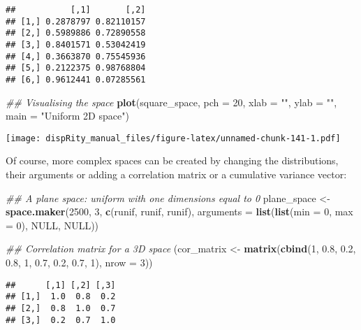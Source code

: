 \documentclass[
]{book}
\newenvironment{Shaded}{\begin{snugshade}}{\end{snugshade}}
\newcommand{\CommentTok}[1]{\textcolor[rgb]{0.56,0.35,0.01}{\textit{#1}}}
\newcommand{\DataTypeTok}[1]{\textcolor[rgb]{0.13,0.29,0.53}{#1}}
\newcommand{\DecValTok}[1]{\textcolor[rgb]{0.00,0.00,0.81}{#1}}
\newcommand{\FloatTok}[1]{\textcolor[rgb]{0.00,0.00,0.81}{#1}}
\newcommand{\KeywordTok}[1]{\textcolor[rgb]{0.13,0.29,0.53}{\textbf{#1}}}
\newcommand{\NormalTok}[1]{#1}
\newcommand{\OtherTok}[1]{\textcolor[rgb]{0.56,0.35,0.01}{#1}}
\newcommand{\StringTok}[1]{\textcolor[rgb]{0.31,0.60,0.02}{#1}}
\begin{document}
\begin{verbatim}
##           [,1]       [,2]
## [1,] 0.2878797 0.82110157
## [2,] 0.5989886 0.72890558
## [3,] 0.8401571 0.53042419
## [4,] 0.3663870 0.75545936
## [5,] 0.2122375 0.98768804
## [6,] 0.9612441 0.07285561
\end{verbatim}

\begin{Shaded}
\begin{Highlighting}[]
\CommentTok{\#\# Visualising the space}
\KeywordTok{plot}\NormalTok{(square\_space, }\DataTypeTok{pch =} \DecValTok{20}\NormalTok{, }\DataTypeTok{xlab =} \StringTok{""}\NormalTok{, }\DataTypeTok{ylab =} \StringTok{""}\NormalTok{,}
     \DataTypeTok{main =} \StringTok{"Uniform 2D space"}\NormalTok{)}
\end{Highlighting}
\end{Shaded}

\texttt{[image: dispRity\_manual\_files/figure-latex/unnamed-chunk-141-1.pdf]}

Of course, more complex spaces can be created by changing the distributions, their arguments or adding a correlation matrix or a cumulative variance vector:

\begin{Shaded}
\begin{Highlighting}[]
\CommentTok{\#\# A plane space: uniform with one dimensions equal to 0}
\NormalTok{plane\_space \textless{}{-}}\StringTok{ }\KeywordTok{space.maker}\NormalTok{(}\DecValTok{2500}\NormalTok{, }\DecValTok{3}\NormalTok{, }\KeywordTok{c}\NormalTok{(runif, runif, runif),}
                           \DataTypeTok{arguments =} \KeywordTok{list}\NormalTok{(}\KeywordTok{list}\NormalTok{(}\DataTypeTok{min =} \DecValTok{0}\NormalTok{, }\DataTypeTok{max =} \DecValTok{0}\NormalTok{),}
                           \OtherTok{NULL}\NormalTok{, }\OtherTok{NULL}\NormalTok{))}

\CommentTok{\#\# Correlation matrix for a 3D space}
\NormalTok{(cor\_matrix \textless{}{-}}\StringTok{ }\KeywordTok{matrix}\NormalTok{(}\KeywordTok{cbind}\NormalTok{(}\DecValTok{1}\NormalTok{, }\FloatTok{0.8}\NormalTok{, }\FloatTok{0.2}\NormalTok{, }\FloatTok{0.8}\NormalTok{, }\DecValTok{1}\NormalTok{, }\FloatTok{0.7}\NormalTok{, }\FloatTok{0.2}\NormalTok{, }\FloatTok{0.7}\NormalTok{, }\DecValTok{1}\NormalTok{), }\DataTypeTok{nrow =} \DecValTok{3}\NormalTok{))}
\end{Highlighting}
\end{Shaded}

\begin{verbatim}
##      [,1] [,2] [,3]
## [1,]  1.0  0.8  0.2
## [2,]  0.8  1.0  0.7
## [3,]  0.2  0.7  1.0
\end{verbatim}
\end{document}
